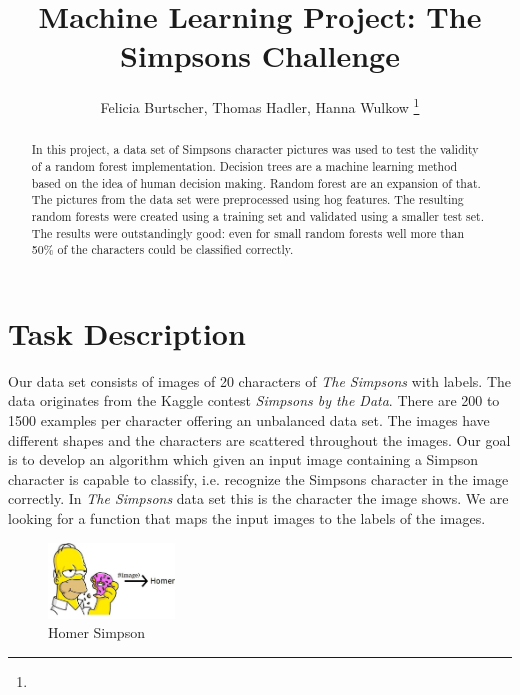 \documentclass[journal, a4paper]{IEEEtran}
\begin{document}
	\title{Machine Learning Project: The Simpsons Challenge}
	\author{Felicia Burtscher, Thomas Hadler, Hanna Wulkow 
	\thanks{}}
	\maketitle

\begin{abstract}
In this project, a data set of Simpsons character pictures was used to test the validity of a random forest implementation. Decision trees are a machine learning method based on the idea of human decision making. Random forest are an expansion of that. The pictures from the data set were preprocessed using hog features.
The resulting random forests were created using a training set and validated using a smaller test set. The results were outstandingly good: even for small random forests well more than 50\% of the characters could be classified correctly. 
\end{abstract}
\section{Task Description}

Our data set consists of images of 20 characters of \textit{The Simpsons} with labels. The data originates from the Kaggle contest \textit{Simpsons by the Data}. There are 200 to 1500 examples per character offering an unbalanced data set. The images have different shapes and the characters are scattered throughout the images. Our goal is to develop an algorithm which given an input image containing a Simpson character is capable to classify, i.e. recognize the Simpsons character in the image correctly. In \textit{The Simpsons} data set this is the character the image shows. We are looking for a function that maps the input images to the labels of the images.
\begin{figure}[!ht]
	\centering
  \includegraphics[width=0.3\textwidth]{Image3.jpeg}
	\caption{Homer Simpson}
	\label{Homer}
\end{figure}
\end{document}
